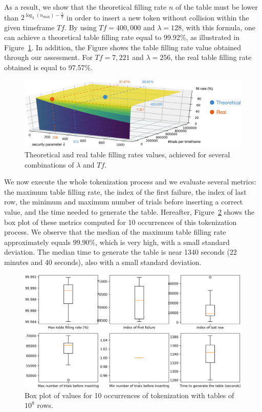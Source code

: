 \documentclass{llncs}
\begin{document}
As a result, we show that the theoretical filling rate $n$ of the table must be lower than $2^{\log_2(n_{\max})-\frac{\lambda}{T}}$ in order to insert a new token without collision within the given timeframe $Tf$. By using $Tf = 400,000$ and $\lambda=128$, with this formula, one can achieve a theoretical table filling rate equal to 99.92\%, as illustrated in Figure~\ref{fig:3d-plot}. In addition, the Figure shows the table filling rate value obtained through our assessment. For $Tf=7,221$ and $\lambda=256$, the real table filling rate obtained is equal to 97.57\%.

\begin{figure}
    \centering
    \includegraphics[width=\textwidth]{figures/3d_plot}
    \caption{Theoretical and real table filling rates values, achieved for several combinations of $\lambda$ and $Tf$.}
    \label{fig:3d-plot}
\end{figure}

We now execute the whole tokenization process and we evaluate several metrics: the maximum table filling rate, the index of the first failure, the index of last row, the minimum and maximum number of trials before inserting a correct value, and the time needed to generate the table.
Hereafter, Figure~\ref{fig:boxplot} shows the box plot of these metrics computed for 10 occurrences of this tokenization process. We observe that the median of the maximum table filling rate approximately equals $99.90\%$, which is very high, with a small standard deviation. The median time to generate the table is near 1340 seconds (22 minutes and 40 seconds), also with a small standard deviation.

\begin{figure}
    \centering
    \includegraphics[width=\textwidth]{figures/boxplot}
    \caption{Box plot of values for 10 occurrences of tokenization with tables of $10^8$ rows.}
    \label{fig:boxplot}
\end{figure}
\end{document}

